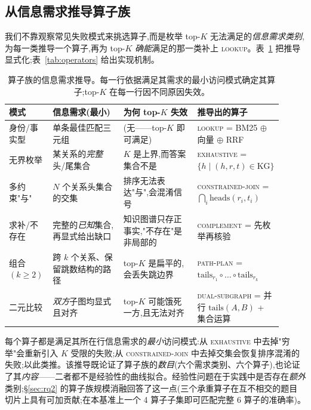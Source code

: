 \documentclass[11pt,a4paper]{article}
\newcommand{\op}[1]{\textsc{\small #1}}
\begin{document}
\subsection{从信息需求推导算子族}
\label{sec:derivation}

我们不靠观察常见失败模式来挑选算子,而是枚举 top-$K$ 无法满足的\emph{信息需求类别},为每一类推导一个算子,再为 top-$K$ \emph{确能}满足的那一类补上 \op{lookup}。表~\ref{tab:reqs} 把推导显式化;表~\ref{tab:operators} 给出实现机制。

\begin{table}[t]
\centering\small
\caption{算子族的信息需求推导。每一行依据满足其需求的最小访问模式确定其算子;top-$K$ 在每一行因不同原因失效。}
\label{tab:reqs}
\setlength{\tabcolsep}{4pt}
\begin{tabular}{p{0.16\linewidth} p{0.27\linewidth} p{0.28\linewidth} p{0.20\linewidth}}
\toprule
\textbf{模式} & \textbf{信息需求(最小)} & \textbf{为何 top-$K$ 失效} & \textbf{推导出的算子} \\
\midrule
身份/事实型     & 单条最佳匹配三元组                       & (无——top-$K$ 即可满足)                       & \op{lookup} = BM25 $\oplus$ 向量 $\oplus$ RRF \\
无界枚举        & 某关系的\emph{完整}头/尾集合             & $K$ 是上界,而答案集合不是                     & \op{exhaustive} = $\{h \mid (h,r,t)\!\in\!\text{KG}\}$ \\
多约束"与"      & $N$ 个关系头集合的交集                    & 排序无法表达"与",会混淆信号                   & \op{constrained-join} = $\bigcap_i \text{heads}(r_i,t_i)$ \\
求补/不存在     & 完整的\emph{已知}集合,再显式给出缺口      & 知识图谱只存正事实,"不存在"是非局部的         & \op{complement} = 先枚举再核验 \\
组合 $(k\!\geq\!2)$ & 跨 $k$ 个关系、保留跳数结构的路径    & top-$K$ 是扁平的,会丢失跳边界                 & \op{path-plan} = $\text{tails}_{r_1}\!\circ\!\dots\!\circ\!\text{tails}_{r_k}$ \\
二元比较        & \emph{双方}子图均显式且对齐              & top-$K$ 可能饿死一方,且无法对齐               & \op{dual-subgraph} = 并行 $\text{tails}(A,B)$ + 集合运算 \\
\bottomrule
\end{tabular}
\end{table}

每个算子都是满足其所在行信息需求的\emph{最小}访问模式:从 \op{exhaustive} 中去掉"穷举"会重新引入 $K$ 受限的失败;从 \op{constrained-join} 中去掉交集会恢复排序混淆的失败;以此类推。该推导既论证了算子族的\emph{数目}(六个需求类别、六个算子),也论证了其\emph{内容}——二者都不是经验性的曲线拟合。经验性问题在于实践中是否存在\emph{额外}类别;\S\ref{sec:rq2} 的算子族规模消融回答了这一点(三个承重算子在互不相交的题目切片上具有可加贡献;在本基准上一个 4 算子子集即可匹配完整 6 算子的准确率)。
\end{document}
